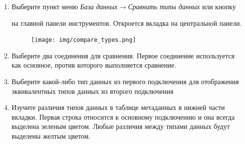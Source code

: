 \begin{enumerate}[leftmargin=39pt]
	\item Выберите пункт меню  \textit{База данных}$\rightarrow$\textit{Сравнить типы данных} или кнопку  на главной панели инструментов. Откроется вкладка на центральной панели.
	\begin{figure}[H]
		\flushright
		\texttt{[image: img/compare\_types.png]}
	\end{figure}
	\item Выберите два соединения для сравнения. Первое соединение используется как основное, против которого выполняется сравнение.
	\item Выберите какой-либо тип данных из первого подключения для отображения эквивалентных типов данных из второго подключения
	\item Изучите различия типов данных в таблице метаданных в нижней части вкладки. Первая строка относится к основному подключению и она всегда выделена зеленым цветом. Любые различия между типами данных будут выделены желтым цветом.
\end{enumerate}

\newpage

